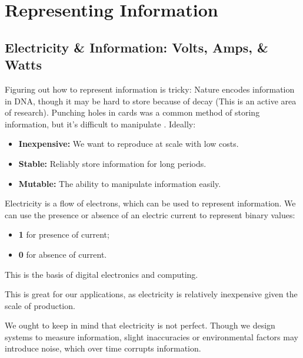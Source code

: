\section{Representing Information}

\subsection{Electricity \& Information: Volts, Amps, \& Watts}
\label{sec:info}

\noindent
Figuring out how to represent information is tricky: Nature encodes information in DNA, though 
it may be hard to store because of decay (This is an active area of research). Punching holes 
in cards was a common method of storing information, but it's difficult to manipulate \cite{terman2017computation_structures}. Ideally:
\begin{itemize}
    \item \textbf{Inexpensive:} We want to reproduce at scale with low costs.
    \item \textbf{Stable:} Reliably store information for long periods.
    \item \textbf{Mutable:} The ability to manipulate information easily.
\end{itemize}

\begin{Def}

    \label{def:elec_info}

    Electricity is a flow of electrons, which can be used to represent information. 
    We can use the presence or absence of an electric current to represent binary values:
    \begin{itemize}
        \item \textbf{1} for presence of current;
        \item \textbf{0} for absence of current.
    \end{itemize}
    \noindent
    This is the basis of digital electronics and computing.
\end{Def}
\noindent
This is great for our applications, as electricity is relatively inexpensive given the scale of production.

\begin{theo}

    \label{theo:noise}

    We ought to keep in mind that electricity is not perfect. Though we design systems to measure information,
    slight inaccuracies or environmental factors may introduce noise, which over time corrupts information.
\end{theo}

